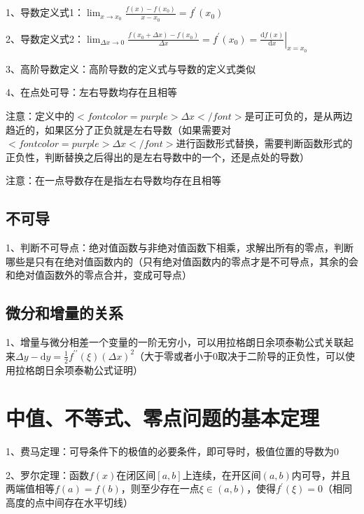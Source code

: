 1、导数定义式1：$ \lim _{x \rightarrow x_{0}} \frac{f(x)-f\left(x_{0}\right)}{x-x_{0}}=f^{\prime}\left(x_{0}\right) $

2、导数定义式2：$ \lim _{\Delta x \rightarrow 0} \frac{f\left(x_{0}+\Delta x\right)-f\left(x_{0}\right)}{\Delta x}=f^{\prime}\left(x_{0}\right)=\left.\frac{\mathrm{d} f(x)}{\mathrm{d} x}\right|_{x=x_{0}} $

3、高阶导数定义：高阶导数的定义式与导数的定义式类似

4、在点处可导：左右导数均存在且相等

注意：定义中的$ <font color=purple>\Delta x</font> $是可正可负的，是从两边趋近的，如果区分了正负就是左右导数（如果需要对$ <font color=purple>\Delta x</font> $进行函数形式替换，需要判断函数形式的正负性，判断替换之后得出的是左右导数中的一个，还是点处的导数）

注意：在一点导数存在是指左右导数均存在且相等



\subsection{不可导}

1、判断不可导点：绝对值函数与非绝对值函数下相乘，求解出所有的零点，判断哪些是只有在绝对值函数内的（只有绝对值函数内的零点才是不可导点，其余的会和绝对值函数外的零点合并，变成可导点）



\subsection{微分和增量的关系}

1、增量与微分相差一个变量的一阶无穷小，可以用拉格朗日余项泰勒公式关联起来$ \Delta y-\mathrm{d} y=\frac{1}{2} f^{\prime \prime}(\xi)(\Delta x)^{2} $（大于零或者小于0取决于二阶导的正负性，可以使用拉格朗日余项泰勒公式证明）

\section{中值、不等式、零点问题的基本定理}

1、费马定理：可导条件下的极值的必要条件，即可导时，极值位置的导数为0

2、罗尔定理：函数$ f(x) $在闭区间$ [a,b] $上连续，在开区间$ (a,b) $内可导，并且两端值相等$ f(a)=f(b) $，则至少存在一点$ \xi \in(a, b) $，使得$ f^{\prime}(\xi)=0 $（相同高度的点中间存在水平切线）

